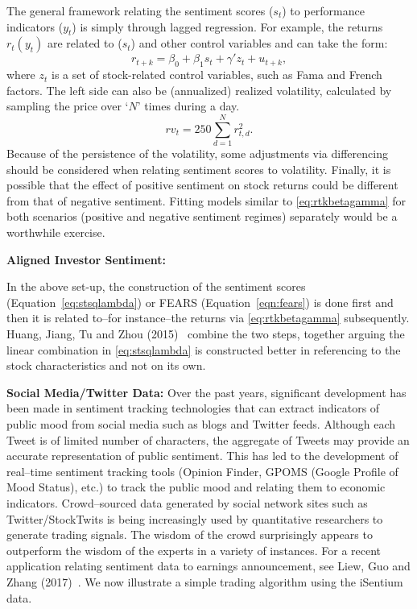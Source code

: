 The general framework relating the sentiment scores ($s_t$) to performance indicators ($y_t$) is simply through lagged regression. For example, the returns $r_t(y_t)$ are related to ($s_t$) and other control variables and can take the form:
	\begin{equation} \label{eq:rtkbetagamma}
	r_{t+k}= \beta_0 + \beta_1 s_t + \gamma' z_t + u_{t+k},
	\end{equation}
where $z_t$ is a set of stock-related control variables, such as Fama and French factors. The left side can also be (annualized) realized volatility, calculated by sampling the price over `$N$' times during a day. 
	\begin{equation}
	rv_t = 250 \sum_{d=1}^N r_{t,d}^2.
	\end{equation}
Because of the persistence of the volatility, some adjustments via differencing should be considered when relating sentiment scores to volatility. Finally, it is possible that the effect of positive sentiment on stock returns could be different from that of negative sentiment. Fitting models similar to \eqref{eq:rtkbetagamma} for both scenarios (positive and negative sentiment regimes) separately would be a worthwhile exercise. \twomedskip


\noindent\textbf{Aligned Investor Sentiment:} \twomedskip


In the above set-up, the construction of the sentiment scores (Equation~\ref{eq:stsqlambda}) or FEARS (Equation~\ref{eqn:fears}) is done first and then it is related to--for instance--the returns via \eqref{eq:rtkbetagamma} subsequently. Huang, Jiang, Tu and Zhou (2015)~\cite{huang} combine the two steps, together arguing the linear combination in \eqref{eq:stsqlambda} is constructed better in referencing to the stock characteristics and not on its own. \twomedskip


\noindent \textbf{Social Media/Twitter Data:} Over the past years, significant development has been made in sentiment tracking technologies that can extract indicators of public mood from social media such as blogs and Twitter feeds. Although each Tweet is of limited number of characters, the aggregate of Tweets may provide an accurate representation of public sentiment. This has led to the development of real--time sentiment tracking tools (Opinion Finder, GPOMS (Google Profile of Mood Status), etc.) to track the public mood and relating them to economic indicators. Crowd--sourced data generated by social network sites such as Twitter/StockTwits is being increasingly used by quantitative researchers to generate trading signals. The wisdom of the crowd surprisingly appears to outperform the wisdom of the experts in a variety of instances. For a recent application relating sentiment data to earnings announcement, see Liew, Guo and Zhang (2017)~\cite{liewzhang}. We now illustrate a simple trading algorithm using the iSentium data.


